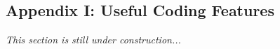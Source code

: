 \begin{appendices}
\noappendicestocpagenum
	
\chapter{Appendix I: Useful Coding Features}

\textit{This section is still under construction...}
	
\end{appendices}





